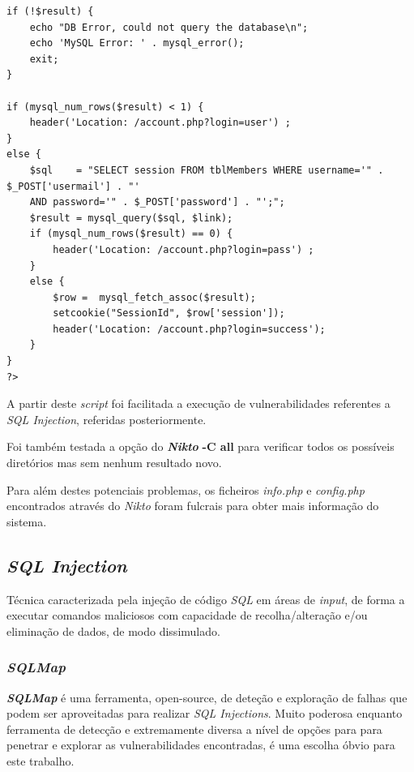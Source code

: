 \documentclass[10pt,english]{article}
\begin{document}
\begin{itemize}
\begin{itemize}
\begin{lstlisting}
if (!$result) {
    echo "DB Error, could not query the database\n";
    echo 'MySQL Error: ' . mysql_error();
    exit;
}

if (mysql_num_rows($result) < 1) {
    header('Location: /account.php?login=user') ;
}
else {
    $sql    = "SELECT session FROM tblMembers WHERE username='" . $_POST['usermail'] . "' 
    AND password='" . $_POST['password'] . "';";
    $result = mysql_query($sql, $link);
    if (mysql_num_rows($result) == 0) {
        header('Location: /account.php?login=pass') ;
    }
    else {
        $row =  mysql_fetch_assoc($result);
        setcookie("SessionId", $row['session']);
        header('Location: /account.php?login=success');
    }
}
?>
    \end{lstlisting}
    
    \par A partir deste \textit{script} foi facilitada a execução de vulnerabilidades referentes a \textit{SQL Injection}, referidas posteriormente.

    \end{itemize}
    
    \end{itemize}
    
    \par Foi também testada a opção do \textit{\textbf{Nikto}} \textbf{-C all} para verificar todos os possíveis diretórios mas sem nenhum resultado novo.
    
    \par Para além destes potenciais problemas, os ficheiros \textit{info.php} e \textit{config.php} encontrados através do \textit{Nikto} foram fulcrais para obter mais informação do sistema.


\subsection{\textit{SQL Injection}}

\par Técnica caracterizada pela injeção de código \textit{SQL} em áreas de \textit{input}, de forma a executar comandos maliciosos com capacidade de recolha/alteração e/ou eliminação de dados, de modo dissimulado.

\subsubsection{\textit{SQLMap}}

\par \textbf{\textit{SQLMap}} é uma ferramenta, open-source, de deteção e exploração de falhas que podem ser aproveitadas para realizar \textit{SQL Injections}. Muito poderosa enquanto ferramenta de detecção e extremamente diversa a nível de opções para para penetrar e explorar as vulnerabilidades encontradas, é uma escolha óbvio para este trabalho.
\end{document}
